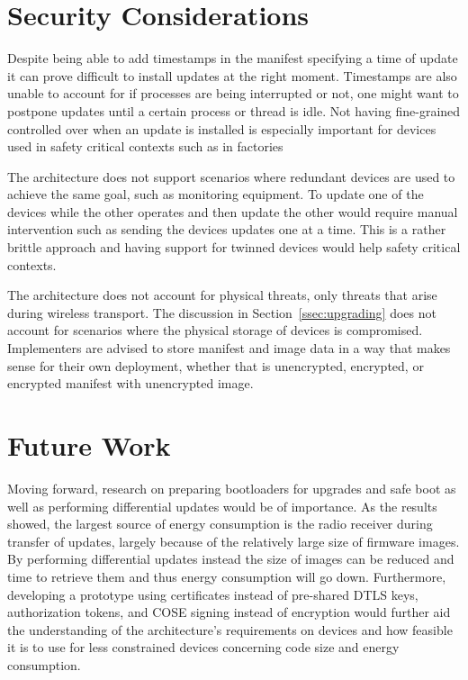 \documentclass[0-thesis.tex]{subfiles}
\begin{document}
\section{Security Considerations}
\label{sec:security-considerations}
Despite being able to add timestamps in the manifest specifying a time of update it can
prove difficult to install updates at the right moment. Timestamps are also unable to
account for if processes are being interrupted or not, one might want to postpone updates
until a certain process or thread is idle. Not having fine-grained controlled over when an
update is installed is especially important for devices used in safety critical contexts
such as in factories

The architecture does not support scenarios where redundant devices are used to achieve
the same goal, such as monitoring equipment. To update one of the devices while the other
operates and then update the other would require manual intervention such as sending the
devices updates one at a time. This is a rather brittle approach and having support for
twinned devices would help safety critical contexts.

The architecture does not account for physical threats, only threats that arise during
wireless transport. The discussion in Section~\ref{ssec:upgrading} does not account for
scenarios where the physical storage of devices is compromised. Implementers are advised
to store manifest and image data in a way that makes sense for their own deployment,
whether that is unencrypted, encrypted, or encrypted manifest with unencrypted image.

\section{Future Work}
\label{sec:future-work}
Moving forward, research on preparing bootloaders for upgrades and safe boot as well as
performing differential updates would be of importance. As the results showed, the largest
source of energy consumption is the radio receiver during transfer of updates, largely
because of the relatively large size of firmware images. By performing differential
updates instead the size of images can be reduced and time to retrieve them and thus
energy consumption will go down. Furthermore, developing a prototype using certificates
instead of pre-shared DTLS keys, authorization tokens, and COSE signing instead of
encryption would further aid the understanding of the architecture's requirements on
devices and how feasible it is to use for less constrained devices concerning code size
and energy consumption. 
\end{document}
